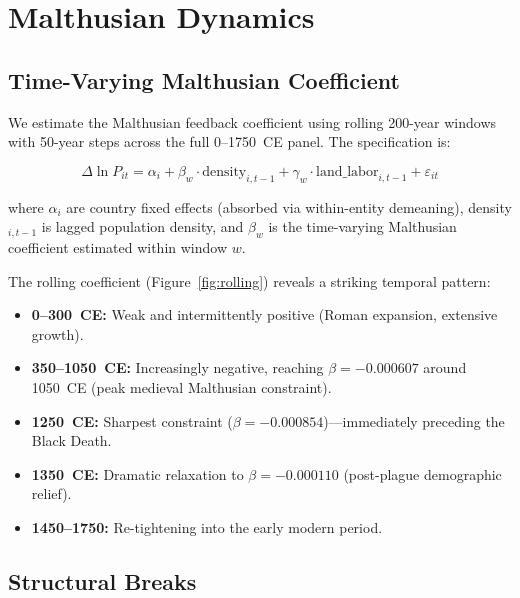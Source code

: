 \documentclass[12pt,letterpaper]{article}
\begin{document}
\section{Malthusian Dynamics}
\label{sec:malthusian}

\subsection{Time-Varying Malthusian Coefficient}

We estimate the Malthusian feedback coefficient using rolling 200-year windows with 50-year steps across the full 0--1750~CE panel. The specification is:

\begin{equation}
  \Delta \ln P_{it} = \alpha_i + \beta_w \cdot \text{density}_{i,t-1} + \gamma_w \cdot \text{land\_labor}_{i,t-1} + \varepsilon_{it}
  \label{eq:malthusian}
\end{equation}

\noindent where $\alpha_i$ are country fixed effects (absorbed via within-entity demeaning), density$_{i,t-1}$ is lagged population density, and $\beta_w$ is the time-varying Malthusian coefficient estimated within window $w$.

The rolling coefficient (Figure~\ref{fig:rolling}) reveals a striking temporal pattern:
\begin{itemize}[nosep]
  \item \textbf{0--300~CE:} Weak and intermittently positive (Roman expansion, extensive growth).
  \item \textbf{350--1050~CE:} Increasingly negative, reaching $\beta = -0.000607$ around 1050~CE (peak medieval Malthusian constraint).
  \item \textbf{1250~CE:} Sharpest constraint ($\beta = -0.000854$)---immediately preceding the Black Death.
  \item \textbf{1350~CE:} Dramatic relaxation to $\beta = -0.000110$ (post-plague demographic relief).
  \item \textbf{1450--1750:} Re-tightening into the early modern period.
\end{itemize}

\subsection{Structural Breaks}
\end{document}
